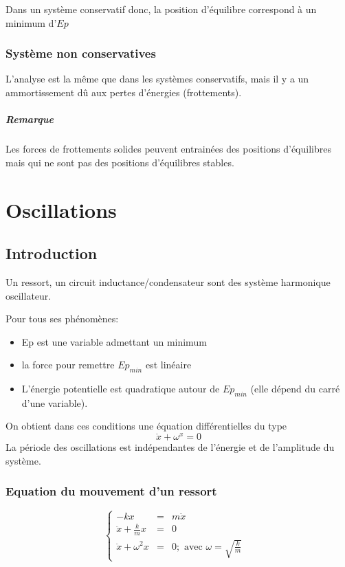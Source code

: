 Dans un système conservatif donc, la position d'équilibre correspond à un minimum d'$Ep$
\subsection{Système non conservatives}
	L'analyse est la même que dans les systèmes conservatifs, mais il y a un ammortissement dû aux pertes d'énergies (frottements).

	\paragraph{Remarque} Les forces de frottements solides peuvent entrainées des positions d'équilibres mais qui ne sont pas des positions d'équilibres stables.

\chapter{Oscillations}

\section{Introduction} Un ressort, un circuit inductance/condensateur sont des système harmonique oscillateur.

Pour tous ses phénomènes:
\begin{itemize}
	\item Ep est une variable admettant un minimum
	\item la force pour remettre $Ep_{min}$ est linéaire
	\item L'énergie potentielle est quadratique autour de $Ep_{min}$ (elle dépend du carré d'une variable).
\end{itemize}

On obtient dans ces conditions une équation différentielles du type \[\ddot{x} + \omega^x = 0\]
La période des oscillations est indépendantes de l'énergie et de l'amplitude du système.

\subsection{Equation du mouvement d'un ressort}
\[\left\{\begin{array}{rcll}
			-kx &=& m\ddot{x}& \\
			\ddot{x} + \frac{k}{m}x &=& 0 \\
			\ddot{x} + \omega^2 x &=& 0 ;\text{ avec } \omega = \sqrt{\frac{k}{m}}
	\end{array}\right.\]


